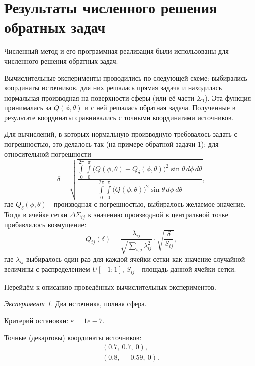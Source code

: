 \section{Результаты численного решения обратных задач}

Численный метод и его программная реализация были использованы для численного решения обратных задач.

Вычислительные эксперименты проводились по следующей схеме: выбирались координаты источников, для них решалась прямая задача и находилась нормальная производная на поверхности сферы (или её части $\Sigma_1$). Эта функция принималась за $Q(\phi, \theta)$ и с ней решалась обратная задача. Полученные в результате координаты сравнивались с точными координатами источников.

Для вычислений, в которых нормальную производную требовалось задать с погрешностью, это делалось так (на примере обратной задачи 1): для относительной погрешности
\begin{equation}
    \delta =
    \sqrt{
        \frac
        {\int\limits_{0}^{2\pi}\int\limits_{0}^{\pi}
        \big(
        Q (\phi,\theta) - Q_\delta (\phi, \theta)
        \big)^2
        \sin{\theta} \, d\phi \, d\theta
        }
        {\int\limits_{0}^{2\pi}\int\limits_{0}^{\pi}
        \big(
        Q (\phi,\theta)
        \big)^2
        \sin{\theta} \, d\phi \, d\theta
        }
    }
    \text{,}
\end{equation}
где $Q_\delta(\phi, \theta)$ - производная с погрешностью, выбиралось желаемое значение. Тогда в ячейке сетки $\Delta \Sigma_{ij}$ к значению производной в центральной точке прибавлялось возмущение:
\begin{equation}
    Q_{ij}(\delta) = \frac{\lambda_{ij}}{\sqrt{\sum_{i,j} \lambda_{ij}^2}} \cdot \sqrt{\frac{\delta}{S_{ij}}} \text{,}
\end{equation}
где $\lambda_{ij}$ выбиралось один раз для каждой ячейки сетки как значение случайной величины с распределением $U[-1;1]$, $S_{ij}$ - площадь данной ячейки сетки.

Перейдём к описанию проведённых вычислительных экспериментов.

\emph{Эксперимент 1.} Два источника, полная сфера.

Критерий остановки: $\varepsilon = 1e-7$.

Точные (декартовы) координаты источников:
\begin{align}
    (0.7,\ 0.7,\ 0) \text{,}\nonumber\\
    (0.8,\ -0.59,\ 0) \text{.}\nonumber
\end{align}

